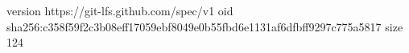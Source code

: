 version https://git-lfs.github.com/spec/v1
oid sha256:c358f59f2c3b08eff17059ebf8049e0b55fbd6e1131af6dfbff9297c775a5817
size 124
